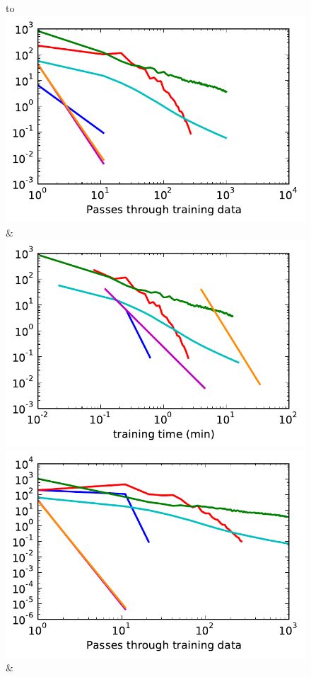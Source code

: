 \begin{figure}
    \begin{tabu} to 
    \\[-3mm]
    \includegraphics[width=\linewidth]{evaluation/images/scene_tree_log}&%
    \includegraphics[width=\linewidth]{evaluation/images/scene_tree_log_time}\\
    \includegraphics[width=\linewidth]{evaluation/images/scene_full_log}&%

\end{tabu}
\end{figure}
